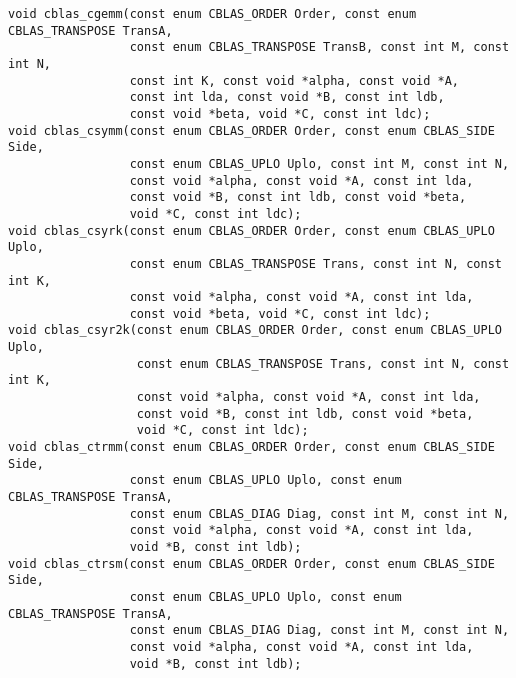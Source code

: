 \documentclass{article}
\begin{document}
\begin{Verbatim}[fontsize=\small,fontfamily=tt,fontshape=rm]
void cblas_cgemm(const enum CBLAS_ORDER Order, const enum CBLAS_TRANSPOSE TransA,
                 const enum CBLAS_TRANSPOSE TransB, const int M, const int N,
                 const int K, const void *alpha, const void *A,
                 const int lda, const void *B, const int ldb,
                 const void *beta, void *C, const int ldc);
void cblas_csymm(const enum CBLAS_ORDER Order, const enum CBLAS_SIDE Side,
                 const enum CBLAS_UPLO Uplo, const int M, const int N,
                 const void *alpha, const void *A, const int lda,
                 const void *B, const int ldb, const void *beta,
                 void *C, const int ldc);
void cblas_csyrk(const enum CBLAS_ORDER Order, const enum CBLAS_UPLO Uplo,
                 const enum CBLAS_TRANSPOSE Trans, const int N, const int K,
                 const void *alpha, const void *A, const int lda,
                 const void *beta, void *C, const int ldc);
void cblas_csyr2k(const enum CBLAS_ORDER Order, const enum CBLAS_UPLO Uplo,
                  const enum CBLAS_TRANSPOSE Trans, const int N, const int K,
                  const void *alpha, const void *A, const int lda,
                  const void *B, const int ldb, const void *beta,
                  void *C, const int ldc);
void cblas_ctrmm(const enum CBLAS_ORDER Order, const enum CBLAS_SIDE Side,
                 const enum CBLAS_UPLO Uplo, const enum CBLAS_TRANSPOSE TransA,
                 const enum CBLAS_DIAG Diag, const int M, const int N,
                 const void *alpha, const void *A, const int lda,
                 void *B, const int ldb);
void cblas_ctrsm(const enum CBLAS_ORDER Order, const enum CBLAS_SIDE Side,
                 const enum CBLAS_UPLO Uplo, const enum CBLAS_TRANSPOSE TransA,
                 const enum CBLAS_DIAG Diag, const int M, const int N,
                 const void *alpha, const void *A, const int lda,
                 void *B, const int ldb);


\end{Verbatim}
\end{document}
